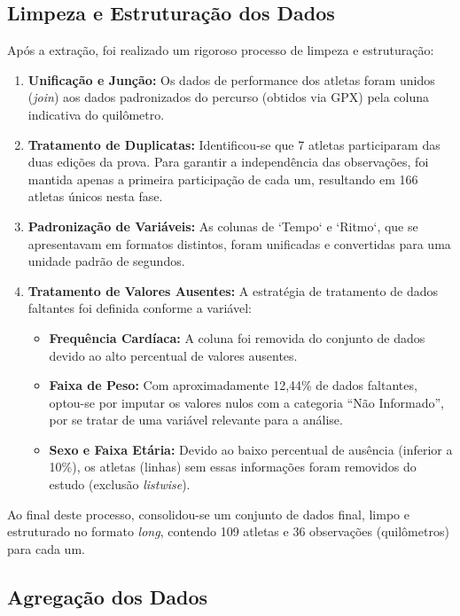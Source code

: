 \subsection{Limpeza e Estruturação dos Dados}
\label{subsec:limpeza}

Após a extração, foi realizado um rigoroso processo de limpeza e estruturação:
\begin{enumerate}
    \item \textbf{Unificação e Junção:} Os dados de performance dos atletas foram unidos (\emph{join}) aos dados padronizados do percurso (obtidos via GPX) pela coluna indicativa do quilômetro.
    
    \item \textbf{Tratamento de Duplicatas:} Identificou-se que 7 atletas participaram das duas edições da prova. Para garantir a independência das observações, foi mantida apenas a primeira participação de cada um, resultando em 166 atletas únicos nesta fase.
    
    \item \textbf{Padronização de Variáveis:} As colunas de `Tempo` e `Ritmo`, que se apresentavam em formatos distintos, foram unificadas e convertidas para uma unidade padrão de segundos.
    
    \item \textbf{Tratamento de Valores Ausentes:} A estratégia de tratamento de dados faltantes foi definida conforme a variável:
    \begin{itemize}
        \item \textbf{Frequência Cardíaca:} A coluna foi removida do conjunto de dados devido ao alto percentual de valores ausentes.
        \item \textbf{Faixa de Peso:} Com aproximadamente 12,44\% de dados faltantes, optou-se por imputar os valores nulos com a categoria ``Não Informado'', por se tratar de uma variável relevante para a análise.
        \item \textbf{Sexo e Faixa Etária:} Devido ao baixo percentual de ausência (inferior a 10\%), os atletas (linhas) sem essas informações foram removidos do estudo (exclusão \emph{listwise}).
    \end{itemize}
\end{enumerate}
Ao final deste processo, consolidou-se um conjunto de dados final, limpo e estruturado no formato \emph{long}, contendo 109 atletas e 36 observações (quilômetros) para cada um.

\subsection{Agregação dos Dados}
\label{sec:preprocessamento}

